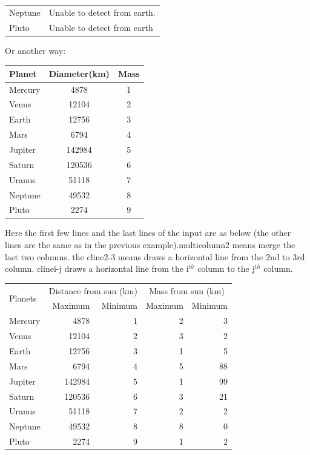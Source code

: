 \documentclass{article}
\theoremstyle{definition}
\theoremstyle{remark}
\theoremstyle{plain}
\numberwithin{equation}{subsection}
\begin{document}
{\begin{center}
\begin{tabular}{lp{.8\linewidth}}
		Neptune & Unable to detect from earth.\\
		Pluto & Unable to detect from earth
	\end{tabular}
\end{center}
Or another way:
\begin{center}
	\begin{tabular}{|l|c|c|}
		\hline
		Planet & Diameter(km) & Mass\\
		\hline
		Mercury & 4878 & 1\\
		Venus & 12104 & 2\\
		Earth & 12756 & 3\\
		Mars & 6794 & 4 \\
		Jupiter & 142984 & 5\\
		Saturn & 120536 & 6\\
		Uranus & 51118 & 7\\
		Neptune & 49532 & 8\\
		Pluto & 2274 & 9\\
		\hline
	\end{tabular}
\end{center}
Here the first few lines and the last lines of the input are as below (the other lines are the same as in the previous example).multicolumn{2} means merge the last two columns. the cline{2-3} means draws a horizontal line from the 2nd to 3rd column. cline{i-j} draws a horizontal line from the i$^{th}$ column to the j$^{th}$ column.
\begin{center}
	\begin{tabular}{|l|r|r|r|r|}
		\hline
		\multirow{2}{1.5cm}{\centering Planets} & \multicolumn{2}{c|}{Distance from sun (km)} & \multicolumn{2}{c|}{Mass from sun (km)}\\
		\cline{2-3}           \cline{4-5}
		& Maximum & Minimum & Maximum & Minimum\\
    	\hline
		Mercury & 4878 & 1 & 2 & 3\\
		Venus  & 12104 & 2 & 3 & 2\\
		Earth & 12756 & 3  & 1& 5\\
		Mars & 6794 & 4    & 5 & 88\\
		Jupiter & 142984 & 5 & 1 & 99\\
		Saturn & 120536 & 6 & 3 & 21\\
		Uranus & 51118 & 7 & 2 & 2\\
		Neptune & 49532 & 8 & 8 & 0\\
		Pluto & 2274 & 9 & 1 & 2\\
		\hline
	\end{tabular}

\end{center}}
\end{document}
